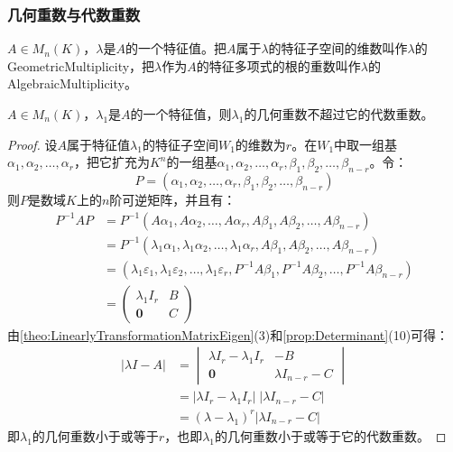 \subsubsection{几何重数与代数重数}
\begin{definition}
	$A\in M_{n}(K)$，$\lambda$是$A$的一个特征值。把$A$属于$\lambda$的特征子空间的维数叫作$\lambda$的\gls{GeometricMultiplicity}，把$\lambda$作为$A$的特征多项式的根的重数叫作$\lambda$的\gls{AlgebraicMultiplicity}。
\end{definition}
\begin{theorem}\label{theo:AlgebraicMultiplicityGeometricMultiplicity}
	$A\in M_{n}(K)$，$\lambda_1$是$A$的一个特征值，则$\lambda_1$的几何重数不超过它的代数重数。
\end{theorem}
\begin{proof}
	设$A$属于特征值$\lambda_1$的特征子空间$W_1$的维数为$r$。在$W_1$中取一组基$\alpha_1,\alpha_2,\dots,\alpha_r$，把它扩充为$K^n$的一组基$\alpha_1,\alpha_2,\dots,\alpha_r,\beta_1,\beta_2,\dots,\beta_{n-r}$。令：
	\begin{equation*}
		P=(\alpha_1,\alpha_2,\dots,\alpha_r,\beta_1,\beta_2,\dots,\beta_{n-r})
	\end{equation*}
	则$P$是数域$K$上的$n$阶可逆矩阵，并且有：
	\begin{align*}
		P^{-1}AP
		&=P^{-1}(A\alpha_1,A\alpha_2,\dots,A\alpha_r,A\beta_1,A\beta_2,\dots,A\beta_{n-r}) \\
		&=P^{-1}(\lambda_1\alpha_1,\lambda_1\alpha_2,\dots,\lambda_1\alpha_r,A\beta_1,A\beta_2,\dots,A\beta_{n-r}) \\
		&=(\lambda_1\varepsilon_1,\lambda_1\varepsilon_2,\dots,\lambda_1\varepsilon_r,P^{-1}A\beta_1,P^{-1}A\beta_2,\dots,P^{-1}A\beta_{n-r}) \\
		&=
		\begin{pmatrix}
			\lambda_1I_r & B \\
			\mathbf{0} & C
		\end{pmatrix}
	\end{align*}
	由\cref{theo:LinearlyTransformationMatrixEigen}(3)和\cref{prop:Determinant}(10)可得：
	\begin{align*}
		|\lambda I-A|&=
		\begin{vmatrix}
			\lambda I_r-\lambda_1I_r & -B \\
			\mathbf{0} & \lambda I_{n-r}-C
		\end{vmatrix} \\
		&=|\lambda I_r-\lambda_1I_r|\;|\lambda I_{n-r}-C| \\
		&=(\lambda-\lambda_1)^r|\lambda I_{n-r}-C|
	\end{align*}
	即$\lambda_1$的几何重数小于或等于$r$，也即$\lambda_1$的几何重数小于或等于它的代数重数。
\end{proof}

